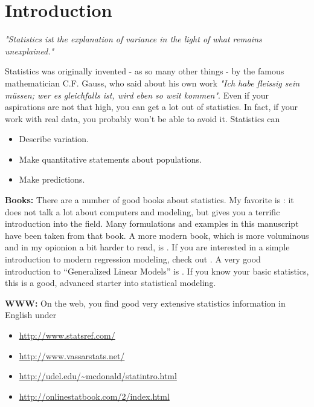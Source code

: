 \chapter{Introduction}

\emph{"Statistics ist the explanation of variance in the light of what remains
unexplained."}

\vspace{5 mm}

Statistics was originally invented - as so many other things - by the famous mathematician C.F. Gauss, who said about his own work \emph{"Ich habe fleissig sein m\"ussen; wer es gleichfalls ist, wird eben so weit kommen"}. Even if your aspirations are not that high, you can get a lot out of statistics. In fact, if your work with real data, you probably won't be able to avoid it. Statistics can

\begin{itemize}
  \item Describe variation.
  \item Make quantitative statements about populations.
  \item Make predictions.
\end{itemize}

\textbf{Books: }There are a number of good books about statistics. My favorite is \cite{altman99}: it does not talk a lot about computers and modeling, but gives you a terrific introduction into the field. Many formulations and examples in this manuscript have been taken from that book. A more modern book, which is more voluminous and in my opionion a bit harder to read, is \cite{Riffenburgh2012}. If you are interested in a simple introduction to modern regression modeling, check out \cite{Kaplan2009}. A very good introduction to “Generalized Linear Models” is \cite{Dobson2008}. If you know your basic statistics, this is a good, advanced starter into statistical modeling.

\vspace{5 mm}

\textbf{WWW: }On the web, you find good very extensive statistics information in English under
\begin{itemize}
    \item \url{http://www.statsref.com/}
    \item \url{http://www.vassarstats.net/}
    \item \url{http://udel.edu/~mcdonald/statintro.html}
    \item \url{http://onlinestatbook.com/2/index.html}
\end{itemize}

